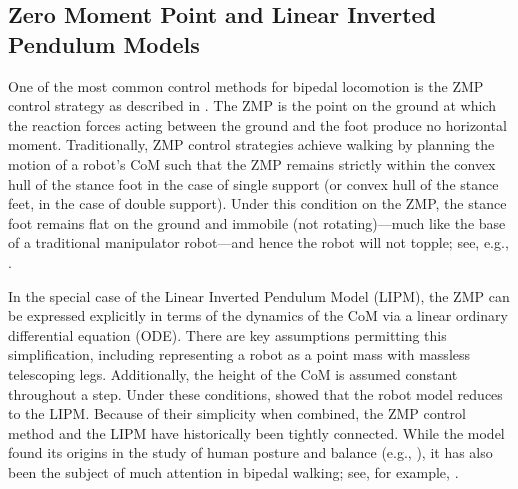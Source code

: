 \subsection{Zero Moment Point and Linear Inverted Pendulum Models}

One of the most common control methods for bipedal locomotion is the ZMP control
strategy as described in \cite{Vukobratovic2004, Vukobratovic1990}.
%
The ZMP is the point on the ground at which the reaction forces acting between
the ground and the foot produce no horizontal moment.
%
Traditionally, ZMP control strategies achieve walking by planning the motion of
a robot's CoM such that the ZMP remains strictly within the convex hull of the
stance foot in the case of single support (or convex hull of the stance feet, in
the case of double support).
%
Under this condition on the ZMP, the stance foot remains flat on the ground and
immobile (not rotating)---much like the base of a traditional manipulator
robot---and hence the robot will not topple; see, e.g., \cite{Yamaguchi1999}.

In the special case of the Linear Inverted Pendulum Model (LIPM),
%
%
the ZMP can be expressed explicitly in terms of the dynamics of the CoM via a
linear ordinary differential equation (ODE).
%
There are key assumptions permitting this simplification, including representing
a robot as a point mass with massless telescoping legs.
%
Additionally, the height of the CoM is assumed constant throughout a step.
%
Under these conditions, \cite{Kajita1991} showed that the robot model reduces to
the LIPM.
%
%
Because of their simplicity when combined, the ZMP control method and the LIPM
have historically been tightly connected.
%
%
%
%
While the model found its origins in the study of human posture and balance
(e.g., \cite{Geursen1976, Winter1995, Patton1999}), it has also been the subject
of much attention in bipedal walking; see, for example, \cite{Miura1984,
  Kajita2001, Kajita2010}.
%



